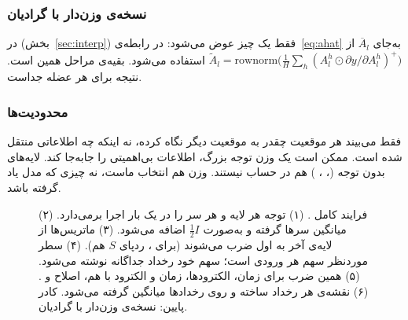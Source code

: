 \subsubsection*{نسخه‌ی وزن‌دار با گرادیان}
در  (بخش~\ref{sec:interp}) فقط یک چیز عوض می‌شود: در رابطه‌ی~\eqref{eq:ahat} به‌جای $\overline{A}_l$ از $\tilde A_l=\mathrm{rownorm}\big(\frac1H\sum_h(A^{h}_l\odot\partial y/\partial A^{h}_l)^{+}\big)$ استفاده می‌شود. بقیه‌ی مراحل همین است. نتیجه برای هر عضله جداست.

\subsubsection*{محدودیت‌ها}
 فقط می‌بیند هر موقعیت چقدر به موقعیت دیگر نگاه کرده، نه اینکه چه اطلاعاتی منتقل شده است. ممکن است یک وزن توجه بزرگ، اطلاعات بی‌اهمیتی را جابه‌جا کند. لایه‌های بدون توجه (، ، ) هم در حساب نیستند. وزن   هم انتخاب ماست، نه چیزی که مدل یاد گرفته باشد.

\begin{figure}[p]
\centering

\caption{فرایند کامل . (۱)  توجه هر لایه و هر سر را در یک بار اجرا برمی‌دارد. (۲) میانگین سرها گرفته و  به‌صورت $\tfrac12 I$ اضافه می‌شود. (۳) ماتریس‌ها از لایه‌ی آخر به اول ضرب می‌شوند (برای ، ردپای  $S$ هم). (۴) سطر  موردنظر سهم هر ورودی است؛ سهم  خود رخداد جداگانه نوشته می‌شود. (۵) همین ضرب برای زمان، الکترودها، زمان و الکترود با هم، اصلاح  و . (۶) نقشه‌ی هر رخداد ساخته و روی رخدادها میانگین گرفته می‌شود. کادر پایین: نسخه‌ی وزن‌دار با گرادیان.}
\label{fig:rollout-process}
\end{figure}

\subsection{}


